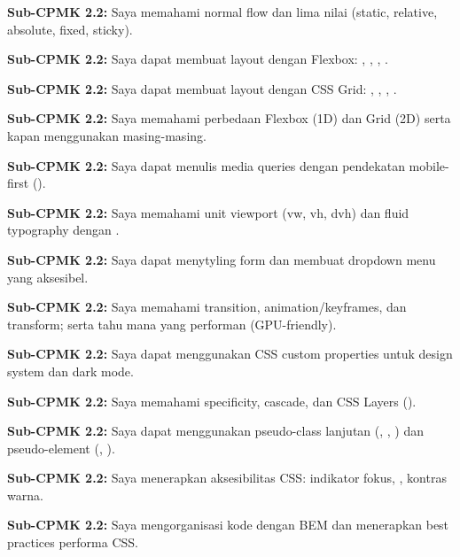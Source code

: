 \documentclass[../main.tex]{subfiles}
\begin{document}
\begin{checklist}
  \item \textbf{Sub-CPMK 2.2:} Saya memahami normal flow dan lima nilai  (static, relative, absolute, fixed, sticky).
  \item \textbf{Sub-CPMK 2.2:} Saya dapat membuat layout dengan Flexbox: , , , .
  \item \textbf{Sub-CPMK 2.2:} Saya dapat membuat layout dengan CSS Grid: , , , .
  \item \textbf{Sub-CPMK 2.2:} Saya memahami perbedaan Flexbox (1D) dan Grid (2D) serta kapan menggunakan masing-masing.
  \item \textbf{Sub-CPMK 2.2:} Saya dapat menulis media queries dengan pendekatan mobile-first ().
  \item \textbf{Sub-CPMK 2.2:} Saya memahami unit viewport (vw, vh, dvh) dan fluid typography dengan .
  \item \textbf{Sub-CPMK 2.2:} Saya dapat menytyling form dan membuat dropdown menu yang aksesibel.
  \item \textbf{Sub-CPMK 2.2:} Saya memahami transition, animation/keyframes, dan transform; serta tahu mana yang performan (GPU-friendly).
  \item \textbf{Sub-CPMK 2.2:} Saya dapat menggunakan CSS custom properties untuk design system dan dark mode.
  \item \textbf{Sub-CPMK 2.2:} Saya memahami specificity, cascade, dan CSS Layers ().
  \item \textbf{Sub-CPMK 2.2:} Saya dapat menggunakan pseudo-class lanjutan (, , ) dan pseudo-element (, ).
  \item \textbf{Sub-CPMK 2.2:} Saya menerapkan aksesibilitas CSS: indikator fokus, , kontras warna.
  \item \textbf{Sub-CPMK 2.2:} Saya mengorganisasi kode dengan BEM dan menerapkan best practices performa CSS.
\end{checklist}
\end{document}
